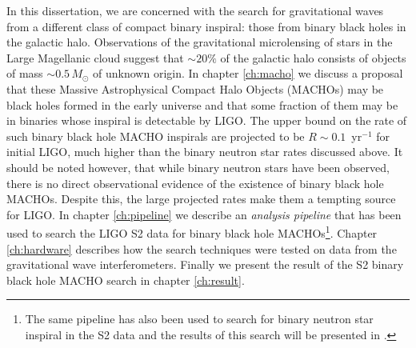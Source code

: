 In this dissertation, we are concerned with the
search for gravitational waves from a different class of compact binary
inspiral: those from binary black holes in the galactic halo. Observations of
the gravitational microlensing of stars in the Large Magellanic cloud suggest
that $\sim 20\%$ of the galactic halo consists of objects of mass $\sim
0.5\,M_\odot$ of unknown origin. In chapter \ref{ch:macho} we discuss a
proposal that these Massive Astrophysical Compact Halo Objects (MACHOs) may be
black holes formed in the early universe and that some fraction of them may be
in binaries whose inspiral is detectable by LIGO\cite{Nakamura:1997sm}.  The
upper bound on the rate of such binary black hole MACHO inspirals are
projected to be $R \sim 0.1$~yr$^{-1}$ for initial LIGO, much higher than the
binary neutron star rates discussed above. It should be noted however, that
while binary neutron stars have been observed, there is no direct
observational evidence of the existence of binary black hole MACHOs. Despite
this, the large projected rates make them a tempting source for LIGO. In
chapter \ref{ch:pipeline} we describe an \emph{analysis pipeline} that has
been used to search the LIGO S2 data for binary black hole MACHOs\footnote{The
same pipeline has also been used to search for binary neutron star inspiral in
the S2 data and the results of this search will be presented in
\cite{LIGOS2iul}.}. Chapter \ref{ch:hardware} describes how the search
techniques were tested on data from the gravitational wave interferometers.
Finally we present the result of the S2 binary black hole MACHO search in
chapter \ref{ch:result}. 
